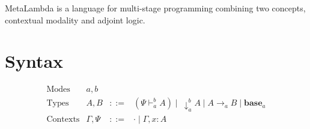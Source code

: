 \documentclass[12pt]{article}
\title{\MetaLambda}
\author{SoonWon Moon}
\newcommand{\MetaLambda}[0]{MetaLambda }
\newcommand{\Modes}[0]{\textrm{Modes}}
\newcommand{\Types}[0]{\textrm{Types}}
\newcommand{\Ctxs}[0]{\textrm{Contexts}}
\newcommand{\upshift}[4]{(#3 \vdash_{#1}^{#2} #4)}
\newcommand{\downshift}[3]{\ \downarrow_{#1}^{#2} #3}
\newcommand{\arrow}[3]{#2 \to_{#1} #3}
\newcommand{\base}[1]{\textbf{base}_{#1}}
\begin{document}
\maketitle

\MetaLambda is a language for multi-stage programming combining two concepts, contextual modality and adjoint logic.

\section{Syntax}
\[
  \begin{array}{llcl}
    \Modes & a, b & \\
    \Types & A, B & ::= & \upshift{a}{b}{\Psi}{A}
                     \mid \downshift{a}{b}{A}
                     \mid \arrow{a}{A}{B}
                     \mid \base{a}
                     \\
    \Ctxs & \Gamma, \Psi & ::= & \cdot \mid \Gamma, x : A \\
  \end{array}
\]
\end{document}
